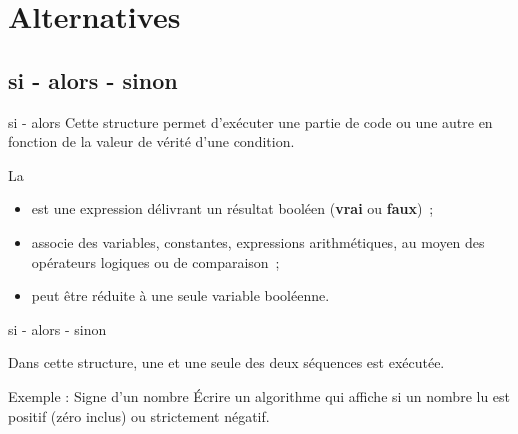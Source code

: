 \section{Alternatives}

\subsection{si - alors - sinon}

\begin{frame}{si - alors}
	Cette structure permet d'exécuter une partie de code ou
	une autre en fonction de la valeur de vérité d'une
	condition.
	
	\bigskip
	
	
	\bigskip
	
	La  
	\begin{itemize}
	\item
	est une expression délivrant un résultat booléen
	(\textbf{vrai} ou \textbf{faux})~; 
	\item
	associe des variables,
	constantes, expressions arithmétiques, au moyen des opérateurs logiques
	ou de comparaison~; 
	\item
	peut être réduite à
	une seule variable booléenne.
	\end{itemize}
\end{frame}

\begin{frame}{si - alors - sinon}

	\bigskip
	
	Dans cette structure, une et une seule des deux séquences est exécutée.

\end{frame}

\begin{frame}{Exemple : Signe d'un nombre}
	Écrire un algorithme qui affiche si un nombre lu est positif (zéro inclus)
	ou strictement négatif.
	
	\bigskip
	

\end{frame}

